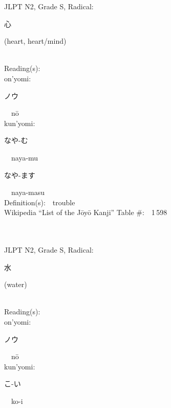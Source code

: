 \begin{multicols}{2}
{JLPT N2, Grade S, Radical:\ \ {\begin{CJK}{UTF8}{min} 心 \end{CJK}} (heart, heart/mind) } \\
Reading(s):\ \ \\
{\hspace*{1em}}on'yomi:\ \ \\
{\hspace*{2em}}{\begin{CJK}{UTF8}{min} ノウ \end{CJK}}\ \ n\=o\ \ \\
{\hspace*{1em}}kun'yomi:\ \ \\
{\hspace*{2em}}{\begin{CJK}{UTF8}{min} なや-む \end{CJK}}\ \ naya-mu\ \ \\
{\hspace*{2em}}{\begin{CJK}{UTF8}{min} なや-ます \end{CJK}}\ \ naya-masu\ \ \\
Definition(s):\ \ trouble \\
Wikipedia ``List of the J\=oy\=o Kanji'' Table \#:\ \ 1\,598 \\
\ \ \\
{\fontsize{34pt}{40pt}  }\ \ \\  %
{JLPT N2, Grade S, Radical:\ \ {\begin{CJK}{UTF8}{min} 水 \end{CJK}} (water) } \\
Reading(s):\ \ \\
{\hspace*{1em}}on'yomi:\ \ \\
{\hspace*{2em}}{\begin{CJK}{UTF8}{min} ノウ \end{CJK}}\ \ n\=o\ \ \\
{\hspace*{1em}}kun'yomi:\ \ \\
{\hspace*{2em}}{\begin{CJK}{UTF8}{min} こ-い \end{CJK}}\ \ ko-i\ \ \\

\end{multicols}
